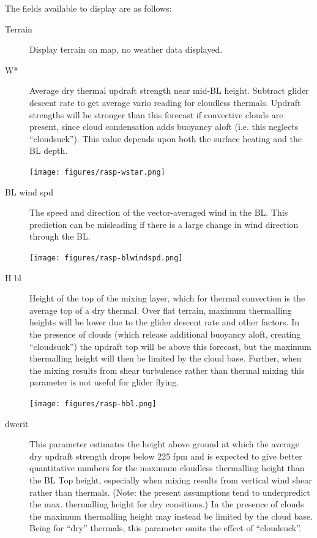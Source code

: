 The fields available to display are as follows:
\begin{description}
\item[Terrain] Display terrain on map, no weather data displayed.

\item[W*] 
Average dry thermal updraft strength near mid-BL height.  Subtract
glider descent rate to get average vario reading for cloudless
thermals.  Updraft strengths will be stronger than this forecast if
convective clouds are present, since cloud condensation adds buoyancy
aloft (i.e. this neglects ``cloudsuck'').  This value depends upon both
the surface heating and the BL depth.

\begin{center}
\texttt{[image: figures/rasp-wstar.png]}
\end{center}

\item[BL wind spd] 
The speed and direction of the vector-averaged wind in the BL.  This
prediction can be misleading if there is a large change in wind
direction through the BL.

\begin{center}
\texttt{[image: figures/rasp-blwindspd.png]}
\end{center}

\item[H bl]  
Height of the top of the mixing layer, which for thermal convection is
the average top of a dry thermal.  Over flat terrain, maximum
thermalling heights will be lower due to the glider descent rate and
other factors.  In the presence of clouds (which release additional
buoyancy aloft, creating ``cloudsuck'') the updraft top will be above
this forecast, but the maximum thermalling height will then be limited
by the cloud base.  Further, when the mixing results from shear
turbulence rather than thermal mixing this parameter is not useful for
glider flying.

\begin{center}
\texttt{[image: figures/rasp-hbl.png]}
\end{center}

\item[dwcrit]  
This parameter estimates the height above ground at which the average
dry updraft strength drops below 225 fpm and is expected to give
better quantitative numbers for the maximum cloudless thermalling
height than the BL Top height, especially when mixing results from
vertical wind shear rather than thermals.  (Note: the present
assumptions tend to underpredict the max. thermalling height for dry
consitions.) In the presence of clouds the maximum thermalling height
may instead be limited by the cloud base.  Being for ``dry'' thermals,
this parameter omits the effect of ``cloudsuck''.


\end{description}
